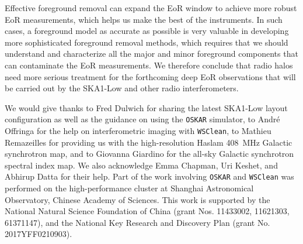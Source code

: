 \documentclass[modern]{aastex62}
\begin{document}
Effective foreground removal can expand the EoR window to achieve more
robust EoR measurements, which helps us make the best of the instruments.
In such cases, a foreground model as accurate as possible is very
valuable in developing more sophisticated foreground removal methods,
which requires that we should understand and characterize all the major
and minor foreground components that can contaminate the EoR measurements.
We therefore conclude that radio halos need more serious treatment for
the forthcoming deep EoR observations that will be carried out by the
SKA1-Low and other radio interferometers.


\acknowledgments

We would give thanks
to Fred Dulwich for sharing the latest SKA1-Low layout configuration as
well as the guidance on using the \texttt{OSKAR} simulator,
to Andr\'e Offringa for the help on interferometric imaging with
\texttt{WSClean},
to Mathieu Remazeilles for providing us with the high-resolution Haslam
\SI{408}{\MHz} Galactic synchrotron map,
and to Giovanna Giardino for the all-sky Galactic synchrotron spectral
index map.
We also acknowledge Emma Chapman, Uri Keshet, and Abhirup Datta for
their help.
Part of the work involving \texttt{OSKAR} and \texttt{WSClean} was
performed on the high-performance cluster at Shanghai Astronomical
Observatory, Chinese Academy of Sciences.
This work is supported by the National Natural Science Foundation of China
(grant Nos. 11433002, 11621303, 61371147),
and the National Key Research and Discovery Plan (grant No. 2017YFF0210903).


%

\vspace{5mm}

\end{document}
